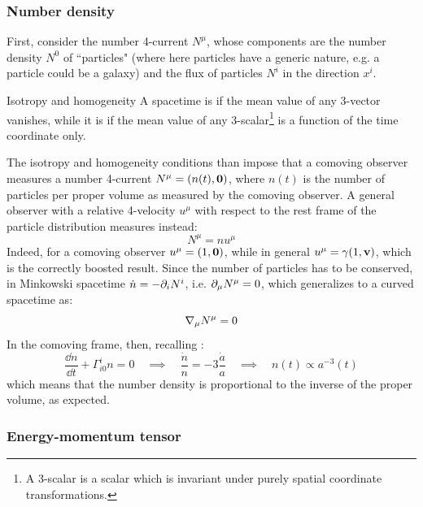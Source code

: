 \subsubsection{Number density}

First, consider the number 4-current $ N^\mu $, whose components are the number density $ N^0 $ of ``particles" (where here particles have a generic nature, e.g. a particle could be a galaxy) and the flux of particles $ N^i $ in the direction $ x^i $.

\begin{definition}{Isotropy and homogeneity}{}
  A spacetime is  if the mean value of any 3-vector vanishes, while it is  if the mean value of any 3-scalar\footnote{A 3-scalar is a scalar which is invariant under purely spatial coordinate transformations.} is a function of the time coordinate only.
\end{definition}

The isotropy and homogeneity conditions than impose that a comoving observer measures a number 4-current $ N^\mu = (n(t) , \mathbf{0}) $, where $ n(t) $ is the number of particles per proper volume as measured by the comoving observer. A general observer with a relative 4-velocity $ u^\mu $ with respect to the rest frame of the particle distribution measures instead:
\begin{equation}
  N^\mu = n u^\mu
\end{equation}
Indeed, for a comoving observer $ u^\mu = (1,\mathbf{0}) $, while in general $ u^\mu = \gamma (1,\mathbf{v}) $, which is the correctly boosted result.
Since the number of particles has to be conserved, in Minkowski spacetime $ \dot{n} = - \partial_i N^i $, i.e. $ \partial_\mu N^\mu = 0 $, which generalizes to a curved spacetime as:
\begin{equation}
  \nabla_\mu N^\mu = 0
\end{equation}
In the comoving frame, then, recalling :
\begin{equation*}
  \frac{\dd n}{\dd t} + \Gamma^i_{i0} n = 0
  \quad \implies \quad
  \frac{\dot{n}}{n} = -3 \frac{\dot{a}}{a}
  \quad \implies \quad
  n(t) \propto a^{-3}(t)
\end{equation*}
which means that the number density is proportional to the inverse of the proper volume, as expected.

\subsubsection{Energy-momentum tensor}

